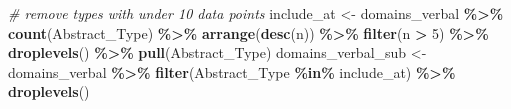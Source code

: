 \documentclass[
]{article}
\newenvironment{Shaded}{\begin{snugshade}}{\end{snugshade}}
\newcommand{\CommentTok}[1]{\textcolor[rgb]{0.56,0.35,0.01}{\textit{#1}}}
\newcommand{\DecValTok}[1]{\textcolor[rgb]{0.00,0.00,0.81}{#1}}
\newcommand{\FunctionTok}[1]{\textcolor[rgb]{0.13,0.29,0.53}{\textbf{#1}}}
\newcommand{\NormalTok}[1]{#1}
\newcommand{\OtherTok}[1]{\textcolor[rgb]{0.56,0.35,0.01}{#1}}
\newcommand{\SpecialCharTok}[1]{\textcolor[rgb]{0.81,0.36,0.00}{\textbf{#1}}}
\begin{document}
\begin{Shaded}
\begin{Highlighting}[]
\CommentTok{\# remove types with under 10 data points}
\NormalTok{include\_at }\OtherTok{\textless{}{-}}\NormalTok{ domains\_verbal }\SpecialCharTok{\%\textgreater{}\%}
  \FunctionTok{count}\NormalTok{(Abstract\_Type) }\SpecialCharTok{\%\textgreater{}\%}
  \FunctionTok{arrange}\NormalTok{(}\FunctionTok{desc}\NormalTok{(n)) }\SpecialCharTok{\%\textgreater{}\%}
  \FunctionTok{filter}\NormalTok{(n }\SpecialCharTok{\textgreater{}} \DecValTok{5}\NormalTok{) }\SpecialCharTok{\%\textgreater{}\%}
  \FunctionTok{droplevels}\NormalTok{() }\SpecialCharTok{\%\textgreater{}\%}
  \FunctionTok{pull}\NormalTok{(Abstract\_Type)}
\NormalTok{domains\_verbal\_sub }\OtherTok{\textless{}{-}}\NormalTok{ domains\_verbal }\SpecialCharTok{\%\textgreater{}\%}
  \FunctionTok{filter}\NormalTok{(Abstract\_Type }\SpecialCharTok{\%in\%}\NormalTok{ include\_at) }\SpecialCharTok{\%\textgreater{}\%}
  \FunctionTok{droplevels}\NormalTok{()}


\end{Highlighting}
\end{Shaded}
\end{document}
